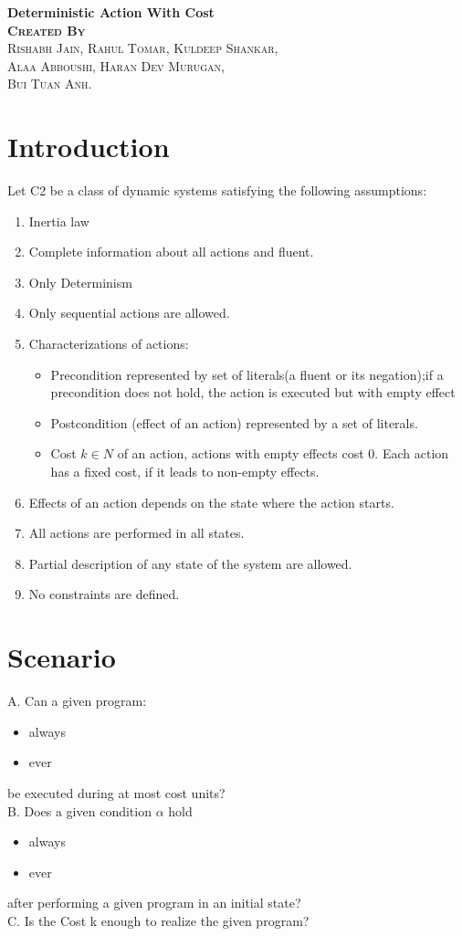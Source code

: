 \documentclass[11pt]{article}
\begin{document}
\begin{titlepage}
\begin{center}
\huge{\bfseries Deterministic Action With Cost}\\
[6in]
\textsc{\Large{\bfseries Created By}\\
Rishabh Jain,
Rahul Tomar,
Kuldeep Shankar,\\ 
Alaa Abboushi,
Haran Dev Murugan,\\
Bui Tuan Anh.\\}
\end{center}	
\end{titlepage}
\tableofcontents
\newpage
\section{Introduction}\label{sec:intro}
Let C2 be a class of dynamic systems satisfying the following assumptions:
\begin{enumerate}
	\item Inertia law
	\item Complete information about all actions and fluent. 
	\item Only Determinism
	\item Only sequential actions are allowed.
	\item Characterizations of actions:\begin{itemize}
		\item Precondition represented by set of literals(a fluent or its negation);if a precondition does not hold, the action is executed but with empty effect
		\item Postcondition (effect of an action) represented by a set of literals.
		\item Cost $k \in N $ of an action, actions with empty effects cost 0. Each action has a fixed cost, if it leads to non-empty effects. 
	\end{itemize}
	\item Effects of an action depends on the state where the action starts.
	\item All actions are performed in all states.
	\item Partial description of any state of the system are allowed.
	\item No constraints are defined.	 
\end{enumerate}
\section{Scenario}\label{sec:scenario}
A. Can a given program:
 \begin{itemize}
 \item always
 \item ever
 \end{itemize} 
be executed during at most cost units? \\
B. Does a given condition \(\alpha\) hold 
 \begin{itemize}
 \item always
 \item ever
 \end{itemize}
 after performing a given program in an initial state?\\ 
C. Is the Cost k enough to realize the given program?
\end{document}
